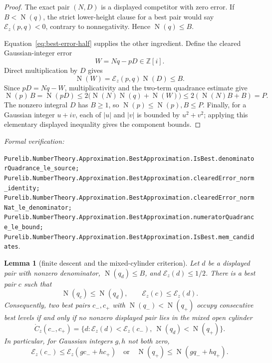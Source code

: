 \documentclass[11pt]{article}
\newtheorem{lemma}[lemma]{Lemma}
\newcommand{\Zi}{\mathbb{Z}[i]}
\newcommand{\Norm}[1]{\operatorname{N}\!\left(#1\right)}
\newcommand{\leanref}[1]{\par\smallskip\noindent
  \emph{Formal verification:}\par\nobreak
  {\raggedright\nolinkurl{#1}.\par}}
\begin{document}
\begin{proof}
The exact pair $(N,D)$ is a displayed competitor with zero error.  If
$B<\Norm q$, the strict lower-height clause for a best pair would say
$\mathcal E_z(p,q)<0$, contrary to nonnegativity.  Hence $\Norm q\le B$.

Equation~\eqref{eq:best-error-half} supplies the other ingredient.  Define
the cleared Gaussian-integer error
\begin{equation}
\label{eq:all-best-cleared-error}
                         W=Nq-pD\in\Zi.
\end{equation}
Direct multiplication by $D$ gives
\begin{equation}
\label{eq:all-best-cleared-norm}
             \Norm W=\mathcal E_z(p,q)\Norm D\le B.
\end{equation}
Since $pD=Nq-W$, multiplicativity and the two-term quadrance estimate give
\[
 \Norm p\,B
   =\Norm{pD}
   \le2\bigl(\Norm N\Norm q+\Norm W\bigr)
   \le2(\Norm N B+B)=P.
\]
The nonzero integral $D$ has $B\ge1$, so $\Norm p\le\Norm p,B\le P$.
Finally, for a Gaussian integer $u+iv$, each of $|u|$ and $|v|$ is bounded
by $u^2+v^2$; applying this elementary displayed inequality gives the
component bounds.
\end{proof}

\leanref{Purelib.NumberTheory.Approximation.BestApproximation.IsBest.denominatorQuadrance_le_source;
Purelib.NumberTheory.Approximation.BestApproximation.clearedError_norm_identity;
Purelib.NumberTheory.Approximation.BestApproximation.clearedError_normNat_le_denominator;
Purelib.NumberTheory.Approximation.BestApproximation.numeratorQuadrance_le_bound;
Purelib.NumberTheory.Approximation.BestApproximation.IsBest.mem_candidates}

\begin{lemma}[finite descent and the mixed-cylinder criterion]
\label{lem:mixed-cylinder-criterion}
Let $d$ be a displayed pair with nonzero denominator,
$\Norm{q_d}\le B$, and $\mathcal E_z(d)\le1/2$.  There is a best pair $c$
such that
\begin{equation}
\label{eq:finite-best-descent}
       \Norm{q_c}\le\Norm{q_d},
       \qquad \mathcal E_z(c)\le\mathcal E_z(d).
\end{equation}
Consequently, two best pairs $c_-,c_+$ with
$\Norm{q_-}<\Norm{q_+}$ occupy consecutive best levels if and only if no
nonzero displayed pair lies in the mixed open cylinder
\begin{equation}
\label{eq:mixed-open-cylinder}
 \mathring{C}_z(c_-,c_+)=
 \{d:\mathcal E_z(d)<\mathcal E_z(c_-),\
          \Norm{q_d}<\Norm{q_+}\}.
\end{equation}
In particular, for Gaussian integers $g,h$ not both zero,
\begin{equation}
\label{eq:linear-combination-exterior}
 \mathcal E_z(c_-)\le\mathcal E_z(gc_-+hc_+)
 \quad\text{or}\quad
 \Norm{q_+}\le\Norm{gq_-+hq_+}.
\end{equation}
\end{lemma}
\end{document}
